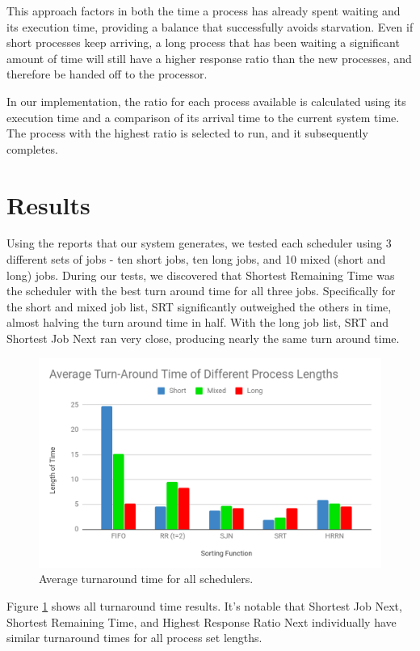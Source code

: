 \documentclass[conference,11pt]{IEEEtran}
\begin{document}
This approach factors in both the time a process has already spent waiting and its execution time, providing a balance that successfully avoids starvation. Even if short processes keep arriving, a long process that has been waiting a significant amount of time will still have a higher response ratio than the new processes, and therefore be handed off to the processor.

In our implementation, the ratio for each process available is calculated using its execution time and a comparison of its arrival time to the current system time. The process with the highest ratio is selected to run, and it subsequently completes.

\section{Results}
Using the reports that our system generates, we tested each scheduler using 3 different sets of jobs - ten short jobs, ten long jobs, and 10 mixed (short and long) jobs. During our tests, we discovered that Shortest Remaining Time was the scheduler with the best turn around time for all three jobs. Specifically for the short and mixed job list, SRT significantly outweighed the others in time, almost halving the turn around time in half. With the long job list, SRT and Shortest Job Next ran very close, producing nearly the same turn around time.

\begin{figure}
\includegraphics[width=\linewidth]{turnaround.png}
\caption{Average turnaround time for all schedulers.}
\label{fig:turnaround}
\end{figure}

Figure \ref{fig:turnaround} shows all turnaround time results. It's notable that Shortest Job Next, Shortest Remaining Time, and Highest Response Ratio Next individually have similar turnaround times for all process set lengths.
\end{document}
